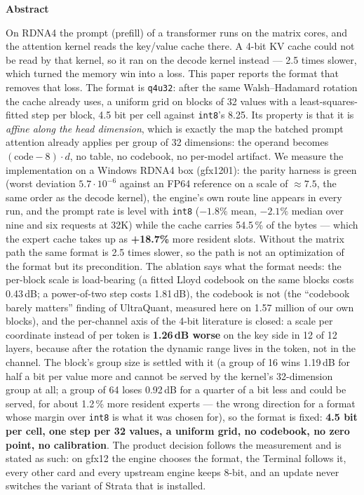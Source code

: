 \documentclass[10pt,twocolumn]{article}
\begin{document}
\noindent\textbf{Abstract}\par
\vspace{0.6ex}
\noindent
On RDNA4 the prompt (prefill) of a transformer runs on the matrix cores, and the attention kernel reads the
key/value cache there. A 4-bit KV cache could not be read by that kernel, so it ran on the decode kernel
instead --- 2.5 times slower, which turned the memory win into a loss. This paper reports the format that
removes that loss. The format is \texttt{q4u32}: after the same Walsh--Hadamard rotation the cache already
uses, a uniform grid on blocks of 32 values with a least-squares-fitted step per block, 4.5 bit per cell
against \texttt{int8}'s 8.25. Its property is that it is \emph{affine along the head dimension}, which is
exactly the map the batched prompt attention already applies per group of 32 dimensions: the operand becomes
$(\text{code}-8)\cdot d$, no table, no codebook, no per-model artifact. We measure the implementation on a
Windows RDNA4 box (gfx1201): the parity harness is green (worst deviation $5.7\cdot10^{-6}$ against an FP64
reference on a scale of $\approx 7.5$, the same order as the decode kernel), the engine's own route line
appears in every run, and the prompt rate is level with \texttt{int8} ($-1.8\%$ mean, $-2.1\%$ median over
nine and six requests at 32K) while the cache carries 54.5\,\% of the bytes --- which the expert cache takes up
as \textbf{+18.7\%} more resident slots. Without the matrix path the same format is 2.5 times slower, so the
path is not an optimization of the format but its precondition. The ablation says what the format needs:
the per-block scale is load-bearing (a fitted Lloyd codebook on the same blocks costs 0.43\,dB; a
power-of-two step costs 1.81\,dB), the codebook is not (the ``codebook barely matters'' finding of
UltraQuant, measured here on 1.57 million of our own blocks), and the per-channel axis of the 4-bit
literature is closed: a scale per coordinate instead of per token is \textbf{1.26\,dB worse} on the key side
in 12 of 12 layers, because after the rotation the dynamic range lives in the token, not in the channel.
The block's group size is settled with it (a group of 16 wins 1.19\,dB for half a bit per value more and
cannot be served by the kernel's 32-dimension group at all; a group of 64 loses 0.92\,dB for a quarter of a
bit less and could be served, for about 1.2\,\% more resident experts --- the wrong direction for a format
whose margin over \texttt{int8} is what it was chosen for), so the format is fixed: \textbf{4.5 bit per
cell, one step per 32 values, a uniform grid, no codebook, no zero point, no calibration}. The
product decision follows the measurement and is stated as such: on gfx12 the engine chooses the format, the
Terminal follows it, every other card and every upstream engine keeps 8-bit, and an update never switches
the variant of Strata that is installed.
\par\medskip
\end{document}
